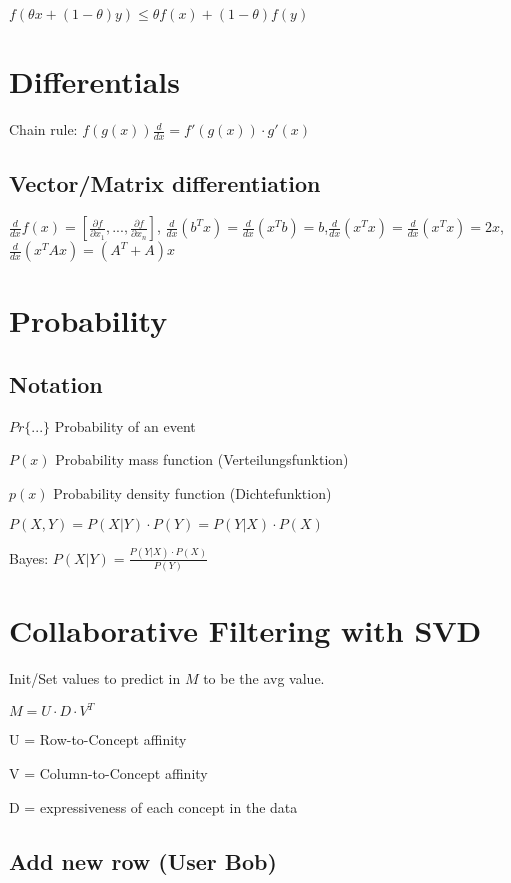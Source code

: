 \documentclass[11pt,twocolumn]{article}
\begin{document}
$f(\theta x + (1-\theta)y) \leq \theta f(x) + (1-\theta) f(y)$

\section{Differentials}

Chain rule: $ f(g(x)) \frac{d}{dx} = f'(g(x)) \cdot g'(x)$

\subsection{Vector/Matrix differentiation}

$\frac{d}{dx} f(x) = \left[ \frac{\partial f }{\partial x_1} ,...,\frac{\partial f}{\partial x_n} \right]$, $\frac{d}{dx}(b^T x) = \frac{d}{dx} (x^T b) = b$,$\frac{d}{dx}(x^T x) = \frac{d}{dx} (x^T x) = 2x$,$\frac{d}{dx}(x^T A x) = (A^T + A) x$

\section{Probability}

\subsection{Notation}
$Pr\lbrace ... \rbrace$ Probability of an event

$P(x)$ Probability mass function (Verteilungsfunktion)

$p(x)$ Probability density function (Dichtefunktion)

$P(X,Y) = P(X|Y) \cdot P(Y) = P(Y|X) \cdot P(X)$

Bayes: $P(X|Y) = \frac{P(Y|X)\cdot P(X)}{P(Y)}$


\section{Collaborative Filtering with SVD}
Init/Set values to predict in $M$ to be the avg value.

$M = U \cdot D \cdot V^T$

U = Row-to-Concept affinity

V = Column-to-Concept affinity

D = expressiveness of each concept in the data

\subsection{Add new row (User Bob)}
\end{document}
